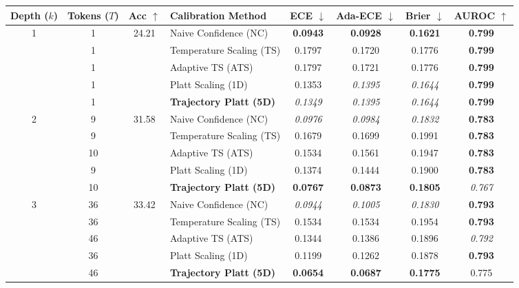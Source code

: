\begin{table}[t]
\setlength{\tabcolsep}{4pt}
\renewcommand{\arraystretch}{1.05}
\centering
\footnotesize
\begin{tabular}{ccclcccc}
\toprule
\textbf{Depth ($k$)} & \textbf{Tokens ($T$)} & \textbf{Acc} $\uparrow$ & \textbf{Calibration Method} & \textbf{ECE} $\downarrow$ & \textbf{Ada-ECE} $\downarrow$ & \textbf{Brier} $\downarrow$ & \textbf{AUROC} $\uparrow$ \\
\midrule
\multirow{5}{*}{1} & 1 & \multirow{5}{*}{24.21} & Naive Confidence (NC) & \textbf{0.0943} & \textbf{0.0928} & \textbf{0.1621} & \textbf{0.799} \\
 & 1 &  & Temperature Scaling (TS) & 0.1797 & 0.1720 & 0.1776 & \textbf{0.799} \\
 & 1 &  & Adaptive TS (ATS) & 0.1797 & 0.1721 & 0.1776 & \textbf{0.799} \\
 & 1 &  & Platt Scaling (1D) & 0.1353 & \textit{0.1395} & \textit{0.1644} & \textbf{0.799} \\
 & 1 &  & \textbf{Trajectory Platt (5D)} & \textit{0.1349} & \textit{0.1395} & \textit{0.1644} & \textbf{0.799} \\
\midrule
\multirow{5}{*}{2} & 9 & \multirow{5}{*}{31.58} & Naive Confidence (NC) & \textit{0.0976} & \textit{0.0984} & \textit{0.1832} & \textbf{0.783} \\
 & 9 &  & Temperature Scaling (TS) & 0.1679 & 0.1699 & 0.1991 & \textbf{0.783} \\
 & 10 &  & Adaptive TS (ATS) & 0.1534 & 0.1561 & 0.1947 & \textbf{0.783} \\
 & 9 &  & Platt Scaling (1D) & 0.1374 & 0.1444 & 0.1900 & \textbf{0.783} \\
 & 10 &  & \textbf{Trajectory Platt (5D)} & \textbf{0.0767} & \textbf{0.0873} & \textbf{0.1805} & \textit{0.767} \\
\midrule
\multirow{5}{*}{3} & 36 & \multirow{5}{*}{33.42} & Naive Confidence (NC) & \textit{0.0944} & \textit{0.1005} & \textit{0.1830} & \textbf{0.793} \\
 & 36 &  & Temperature Scaling (TS) & 0.1534 & 0.1534 & 0.1954 & \textbf{0.793} \\
 & 46 &  & Adaptive TS (ATS) & 0.1344 & 0.1386 & 0.1896 & \textit{0.792} \\
 & 36 &  & Platt Scaling (1D) & 0.1199 & 0.1262 & 0.1878 & \textbf{0.793} \\
 & 46 &  & \textbf{Trajectory Platt (5D)} & \textbf{0.0654} & \textbf{0.0687} & \textbf{0.1775} & 0.775 \\

\end{tabular}
\end{table}
